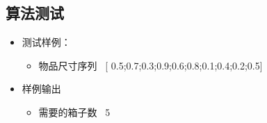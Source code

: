 \documentclass[a4paper]{article}
\begin{document}
\subsection{算法测试}

\begin{itemize}
\item
    测试样例：
    \begin{itemize}
    \item
        物品尺寸序列 \ [ 0.5;0.7;0.3;0.9;0.6;0.8;0.1;0.4;0.2;0.5] 
    \end{itemize}
\item
    样例输出
    \begin{itemize}
    \item
        需要的箱子数 \ 5
    \end{itemize}
\end{itemize}
\end{document}
